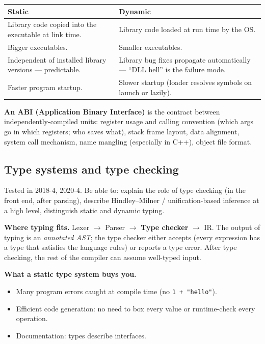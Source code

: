 \documentclass[11pt,a4paper]{article}
\begin{document}
\begin{center}
\begin{tabular}{p{7cm}p{7cm}}
\hline
\textbf{Static} & \textbf{Dynamic} \\
\hline
Library code copied into the executable at link time. & Library code loaded at run time by the OS. \\
Bigger executables. & Smaller executables. \\
Independent of installed library versions --- predictable. & Library bug fixes propagate automatically --- ``DLL hell'' is the failure mode. \\
Faster program startup. & Slower startup (loader resolves symbols on launch or lazily). \\
\hline
\end{tabular}
\end{center}

\textbf{An ABI (Application Binary Interface)} is the contract between independently-compiled units: register usage and calling convention (which args go in which registers; who saves what), stack frame layout, data alignment, system call mechanism, name mangling (especially in C++), object file format.

\subsection{Type systems and type checking}

\begin{useful}
Tested in 2018-4, 2020-4. Be able to: explain the role of type checking (in the front end, after parsing), describe Hindley--Milner / unification-based inference at a high level, distinguish static and dynamic typing.
\end{useful}

\textbf{Where typing fits.} Lexer $\to$ Parser $\to$ \textbf{Type checker} $\to$ IR. The output of typing is an \emph{annotated AST}; the type checker either accepts (every expression has a type that satisfies the language rules) or reports a type error. After type checking, the rest of the compiler can assume well-typed input.

\textbf{What a static type system buys you.}
\begin{itemize}[leftmargin=*,itemsep=0pt]
  \item Many program errors caught at compile time (no \texttt{1 + "hello"}).
  \item Efficient code generation: no need to box every value or runtime-check every operation.
  \item Documentation: types describe interfaces.
\end{itemize}
\end{document}
